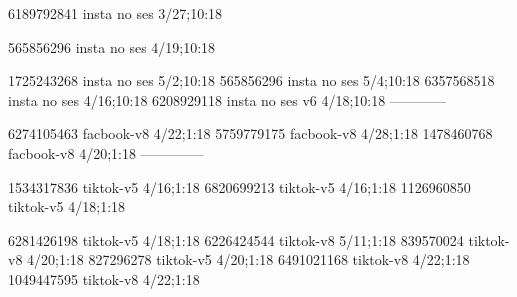 
6189792841 insta no ses
3/27;10:18

565856296 insta no ses
4/19;10:18

1725243268 insta no ses
5/2;10:18
565856296 insta no ses
5/4;10:18
6357568518 insta no ses
4/16;10:18
6208929118 insta no ses v6
4/18;10:18
------------

6274105463 facbook-v8
4/22;1:18
5759779175 facbook-v8
4/28;1:18
1478460768 facbook-v8
4/20;1:18
--------------

1534317836 tiktok-v5
4/16;1:18
6820699213 tiktok-v5
4/16;1:18
1126960850 tiktok-v5
4/18;1:18

6281426198 tiktok-v5
4/18;1:18
6226424544 tiktok-v8
5/11;1:18
839570024 tiktok-v8
4/20;1:18
827296278 tiktok-v5
4/20;1:18
6491021168 tiktok-v8
4/22;1:18
1049447595 tiktok-v8
4/22;1:18
